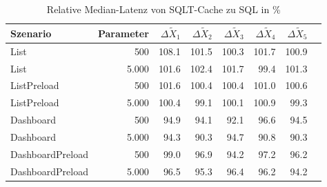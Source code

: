 
\begin{table}[ht]
\setlength{\extrarowheight}{-1pt}
\centering
\caption{Relative Median-Latenz von SQLT-Cache zu SQL in \%}
\begin{tabular}{lrrrrrrr}
\toprule
Szenario & Parameter & ${\Delta \tilde{X}_1}$ & ${\Delta \tilde{X}_2}$ & ${\Delta \tilde{X}_3}$ & ${\Delta \tilde{X}_4}$ & ${\Delta \tilde{X}_5}$ \\
\midrule
	List & 500 & \cellcolor{red!4}  108.1 & \cellcolor{red!1}  101.5 & \cellcolor{red!0}  100.3 & \cellcolor{red!1}  101.7 & \cellcolor{red!0}  100.9 \\
	List & 5.000 & \cellcolor{red!1}  101.6 & \cellcolor{red!1}  102.4 & \cellcolor{red!1}  101.7 & \cellcolor{green!0}  99.4 & \cellcolor{red!1}  101.3 \\
	ListPreload & 500 & \cellcolor{red!1}  101.6 & \cellcolor{red!0}  100.4 & \cellcolor{red!0}  100.4 & \cellcolor{red!0}  101.0 & \cellcolor{red!0}  100.6 \\
	ListPreload & 5.000 & \cellcolor{red!0}  100.4 & \cellcolor{green!0}  99.1 & \cellcolor{red!0}  100.1 & \cellcolor{red!0}  100.9 & \cellcolor{green!0}  99.3 \\
	Dashboard & 500 & \cellcolor{green!3}  94.9 & \cellcolor{green!3}  94.1 & \cellcolor{green!4}  92.1 & \cellcolor{green!2}  96.6 & \cellcolor{green!3}  94.5 \\
	Dashboard & 5.000 & \cellcolor{green!3}  94.3 & \cellcolor{green!5}  90.3 & \cellcolor{green!3}  94.7 & \cellcolor{green!5}  90.8 & \cellcolor{green!5}  90.3 \\
	DashboardPreload & 500 & \cellcolor{green!0}  99.0 & \cellcolor{green!2}  96.9 & \cellcolor{green!3}  94.2 & \cellcolor{green!1}  97.2 & \cellcolor{green!2}  96.2 \\
	DashboardPreload & 5.000 & \cellcolor{green!2}  96.5 & \cellcolor{green!2}  95.3 & \cellcolor{green!2}  96.4 & \cellcolor{green!2}  96.2 & \cellcolor{green!3}  94.2 \\
\bottomrule
\end{tabular}
\label{tab:relative_latenz_sqltcache}
\end{table}
	